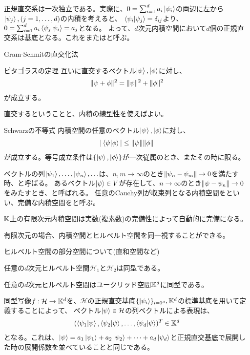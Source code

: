 正規直交系は一次独立である。実際に、$0 = \sum_{i=1}^d a_i \ket{\psi_i}$の両辺に左から$\ket{\psi_j},(j=1,\ldots,d)$の内積を考えると、
$\braket{\psi_i|\psi_j}=\delta_{ij}$より、$0 = \sum_{i=1}^d a_i \braket{\psi_j|\psi_i} = a_j$となる。
よって、$d$次元内積空間において$d$個の正規直交系は基底となる。これをまたはと呼ぶ。

\begin{Memo}
  Gram-Schmitの直交化法
\end{Memo}

\begin{Theorem} ピタゴラスの定理
  互いに直交するベクトル$\ket{\psi},\ket{\phi}$に対し、
  $$
  \|\psi + \phi\|^2 = \|\psi\|^2 + \|\phi\|^2
  $$
  が成立する。
\end{Theorem}
\proof 直交するということと、内積の線型性を使えばよい。

\begin{Theorem} Schwarzの不等式
  内積空間の任意のベクトル$\ket{\psi},\ket{\phi}$に対し、
  $$
  |\braket{\psi|\phi}| \leq \|\psi\|\|\phi\|
  $$
  が成立する。等号成立条件は$\{\ket{\psi},\ket{\phi}\}$が一次従属のとき、またその時に限る。
\end{Theorem}

ベクトルの列$\ket{\psi_1},\ldots,\ket{\psi_n},\ldots$は、$n,m\to\infty$のとき$\|\psi_n - \psi_m\|\to 0$を満たす時、と呼ばる。
あるベクトル$\ket{\psi}\in V$が存在して、$n\to\infty$のとき$\|\psi-\psi_n\|\to 0$をみたすとき、と呼ばれる。
任意のCauchy列が収束列となる内積空間をといい、完備な内積空間をと呼ぶ。
\begin{reidai}
  $\mathbb{K}$上の有限次元内積空間は実数(複素数)の完備性によって自動的に完備になる。
\end{reidai}
有限次元の場合、内積空間とヒルベルト空間を同一視することができる。

\begin{Memo}
  ヒルベルト空間の部分空間について(直和空間など)
\end{Memo}

\begin{Meidai}
  任意の$d$次元ヒルベルト空間$\mathcal{H}_1と\mathcal{H}_2$は同型である。
\end{Meidai}

\begin{Meidai}
  任意の$d$次元ヒルベルト空間はユークリッド空間$\mathbb{K}^d$に同型である。
\end{Meidai}
同型写像$f:\mathcal{H}\to\mathbb{K}^d$を、$\mathcal{H}$の正規直交基底$\{\ket{\psi_i}\}_{i=1^d},\mathbb{K}^d$の標準基底を用いて定義することによって、
ベクトル$\ket{\psi}\in\mathcal{H}$の列ベクトルによる表現は、
$$
  (\braket{\psi_1|\psi},\braket{\psi_2|\psi},\ldots,\braket{\psi_d|\psi})^T \in \mathbb{K}^d
$$
となる。これは、$\ket{\psi} = a_1\ket{\psi_1} + a_2\ket{\psi_2} + \cdots + a_d\ket{\psi_d}$と正規直交基底で展開した時の展開係数を並べていることと同じである。



